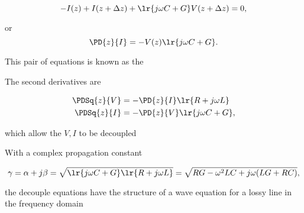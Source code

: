 \begin{dmath}\label{eqn:uwaves4TransmissionLines:60}
-I(z) + I(z + \Delta z) + \lr{ j \omega C + G} V(z + \Delta z) = 0,
\end{dmath}

or
\begin{dmath}\label{eqn:uwaves4TransmissionLines:80}
\PD{z}{I} = -V(z) \lr{ j \omega C + G}.
\end{dmath}

This pair of equations is known as the 


The second derivatives are

\begin{equation}\label{eqn:uwaves4TransmissionLines:120}
\begin{aligned}
\PDSq{z}{V} &= -\PD{z}{I} \lr{ R + j \omega L } \\
\PDSq{z}{I} &= -\PD{z}{V} \lr{ j \omega C + G},
\end{aligned}
\end{equation}

which allow the \( V, I \) to be decoupled

With a complex propagation constant

\begin{dmath}\label{eqn:uwaves4TransmissionLines:160}
\gamma
= \alpha + j \beta
= \sqrt{ \lr{ j \omega C + G} \lr{ R + j \omega L } }
=
\sqrt{ R G - \omega^2 L C + j \omega ( L G + R C ) },
\end{dmath}

the decouple equations have the structure of a wave equation for a lossy line in the frequency domain




